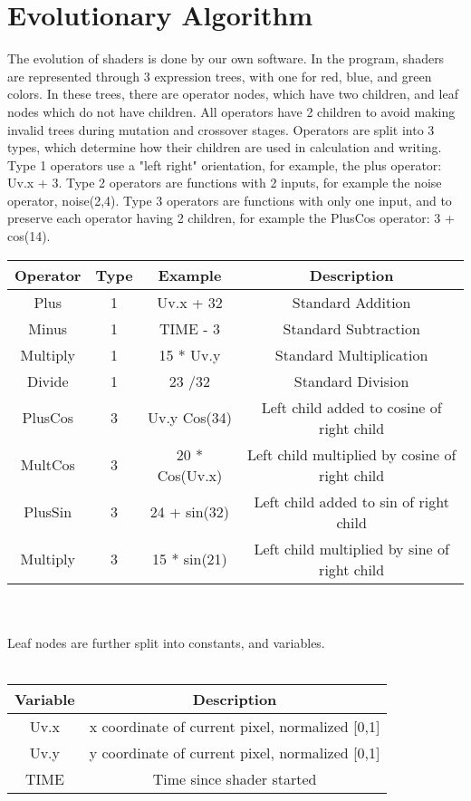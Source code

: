 \documentclass{article}
\begin{document}
\section*{Evolutionary Algorithm}
The evolution of shaders is done by our own software. In the program, shaders are represented through 3 expression trees, with one for red, blue, and green colors. In these trees, there are 
operator nodes, which have two children, and leaf nodes which do not have children. All operators have 2 children to avoid making invalid trees during mutation and crossover stages. 
Operators are split into 3 types, which determine how their children are used in calculation and writing. Type 1 operators use a "left right" orientation, for example, the plus operator: Uv.x + 3. 
Type 2 operators are functions with 2 inputs, for example the noise operator, noise(2,4). Type 3 operators are functions with only one input, and to preserve each operator having 2 children, for example the PlusCos operator: 3 + cos(14).
\\
\begin{tabular}{|c|c|c|c|}
    \hline
    Operator & Type&  Example & Description\\
    \hline
    Plus & 1 & Uv.x + 32 & Standard Addition \\
    \hline
    Minus & 1 &TIME - 3 & Standard Subtraction \\
    \hline
    Multiply & 1 & 15 * Uv.y & Standard Multiplication  \\
    \hline
    Divide & 1 & 23 /32 & Standard Division  \\
    \hline
    PlusCos & 3 & Uv.y Cos(34) & Left child added to cosine of right child  \\
    \hline
    MultCos & 3 & 20 * Cos(Uv.x) & Left child multiplied by cosine of right child  \\
    \hline
    PlusSin & 3  & 24 + sin(32) & Left child added to sin of right child  \\
    \hline
    Multiply & 3 & 15 * sin(21)& Left child multiplied by sine of right child   \\
    \hline
\end{tabular}\\\\
Leaf nodes are further split into constants, and variables. 
\\\\
\begin{tabular}{|c|c|}
    \hline
    Variable & Description \\ 
    \hline
    Uv.x & x coordinate of current pixel, normalized [0,1]\\
    \hline
    Uv.y & y coordinate of current pixel, normalized [0,1]\\
    \hline
    TIME & Time since shader started\\
    \hline
\end{tabular}\\\\
\end{document}
